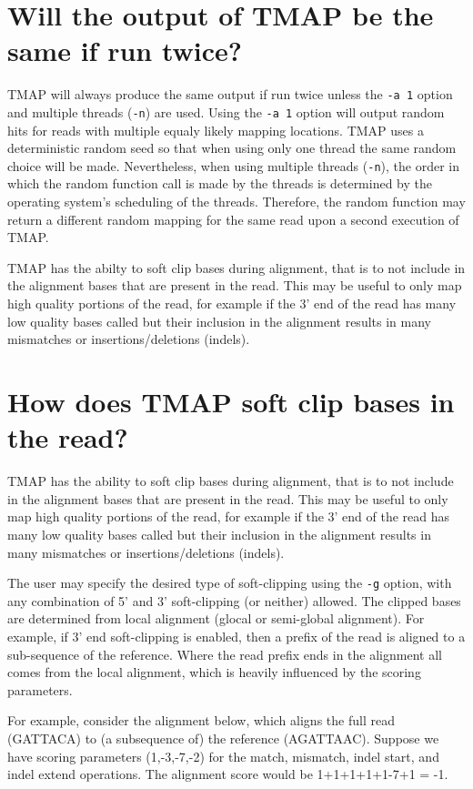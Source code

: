 \documentclass[a4paper,12pt]{book}
\newcommand{\TT}[1]{{\tt #1}} %
\begin{document}
\section{Will the output of TMAP be the same if run twice?}
TMAP will always produce the same output if run twice unless the \TT{-a 1} option and multiple threads (\TT{-n}) are used.
Using the \TT{-a 1} option will output random hits for reads with multiple equaly likely mapping locations.
TMAP uses a deterministic random seed so that when using only one thread the same random choice will be made.
Nevertheless, when using multiple threads (\TT{-n}), the order in which the random function call is made by the threads is determined by the operating system's scheduling of the threads.
Therefore, the random function may return a different random mapping for the same read upon a second execution of TMAP.

TMAP has the abilty to soft clip bases during alignment, that is to not include in the alignment bases that are present in the read.  This may be useful to only map high quality portions of the read, for example if the 3' end of the read has many low quality bases called but their inclusion in the alignment results in many mismatches or insertions/deletions (indels).

\section{How does TMAP soft clip bases in the read?} 
TMAP has the ability to soft clip bases during alignment, that is to not include in the alignment bases that are present in the read.  
This may be useful to only map high quality portions of the read, for example if the 3' end of the read has many low quality bases called but their inclusion in the alignment results in many mismatches or insertions/deletions (indels).

The user may specify the desired type of soft-clipping using the \TT{-g} option, with any combination of 5' and 3' soft-clipping (or neither) allowed. 
The clipped bases are determined from local alignment (glocal or semi-global alignment).  
For example, if 3' end soft-clipping is enabled, then a prefix of the read is aligned to a sub-sequence of the reference.  
Where the read prefix ends in the alignment all comes from the local alignment, which is heavily influenced by the scoring parameters. 

For example, consider the alignment below, which aligns the full read (GATTACA) to (a subsequence of) the reference (AGATTAAC).  
Suppose we have scoring parameters (1,-3,-7,-2) for the match, mismatch, indel start, and indel extend operations.  
The alignment score would be 1+1+1+1+1-7+1 = -1.
\end{document}
